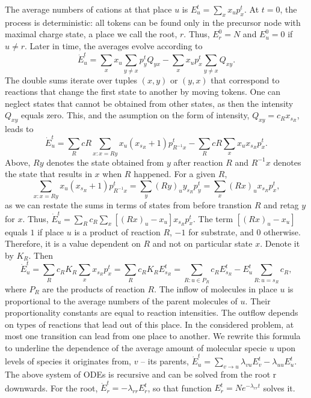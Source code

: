\documentclass{llncs}
\begin{document}
        The average numbers of cations at that place $u$ is $E_u^t= \sum_x x_up_x^t$.
        At $t=0$, the process is deterministic: all tokens can be found only in the precursor node with maximal charge state, a place we call the root, $r$.
        Thus, $E_r^0=N$ and $E_u^0=0$ if $u \not= r$.
        Later in time, the averages evolve according to
        $$\dot E_u^t=\sum_x x_u \sum_{y\not=x} p_y^t Q_{yx} -\sum_x x_u p_x^t \sum_{y\not=x} Q_{xy}.$$
        The double sums iterate over tuples $(x,y)$ or $(y,x)$ that correspond to reactions that change the first state to another by moving tokens.
        One can neglect states that cannot be obtained from other states, as then the intensity $Q_{xy}$ equals zero.
        This, and the asumption on the form of intensity, $Q_{xy}=c_Rx_{s_R}$, leads to
        $$\dot E_u^t = \sum_R cR \sum_{x:x=Ry}  x_u (x_{s_R}+1) p_{R^{-1}x}^t- \sum_R cR \sum_{x} x_u x_{s_R} p_x^t.$$
        Above, $Ry$ denotes the state obtained from $y$ after reaction $R$ and $R^{-1}x$ denotes the state that results in $x$ when $R$ happened.
        For a given $R$,
                $$\sum_{x:x=Ry} x_u (x_{s_R}+1) p_{R^{-1}x}^t = \sum_{y}  (Ry)_u y_{s_R} p_y^t = \sum_x (Rx)_u x_{s_R} p_x^t,$$
        as we can restate the sums in terms of states from before transtion $R$ and retag $y$ for $x$.
        Thus, $\dot E_u^t = \sum_R c_R \sum_x   \left[(Rx)_u-x_u \right] x_{s_R} p_x^t$. The term $\left[(Rx)_u-x_u\right]$ equals $1$ if place $u$ is a product of reaction $R$, $-1$ for substrate, and $0$ otherwise.
        Therefore, it is a value dependent on $R$ and not on particular state $x$.
        Denote it by $K_R$.
        Then
                $$\dot E_u^t = \sum_R c_R K_R \sum_x x_{s_R} p_x^t = \sum_R c_R K_R E_{s_R}^t = \sum_{R:u\in P_R} c_R E_{s_R}^t - E_u^t \sum_{R: u=s_R}c_R,$$
        where $P_R$ are the products of reaction $R$.
        The inflow of molecules in place $u$ is proportional to the average numbers of the parent molecules of $u$.
        Their proportionality constants are equal to reaction intensities.
        The outflow depends on types of reactions that lead out of this place. In the considered problem, at most one transition can lead from one place to another.
        We rewrite this formula to underline the dependence of the average amount of molecular specie $u$ upon levels of species it originates from, $v$ -- its parents, $ \dot E_u^t = \sum_{v\rightarrow u} \lambda_{vu} E_v^t - \lambda_{uu}E_u^t.$
        The above system of ODEs is recursive and can be solved from the root r downwards.
        For the root, $\dot E_r^t=-\lambda_{rr} E_r^t$, so that function $E_r^t= Ne^{-\lambda_{rr}t}$ solves it.
\end{document}
